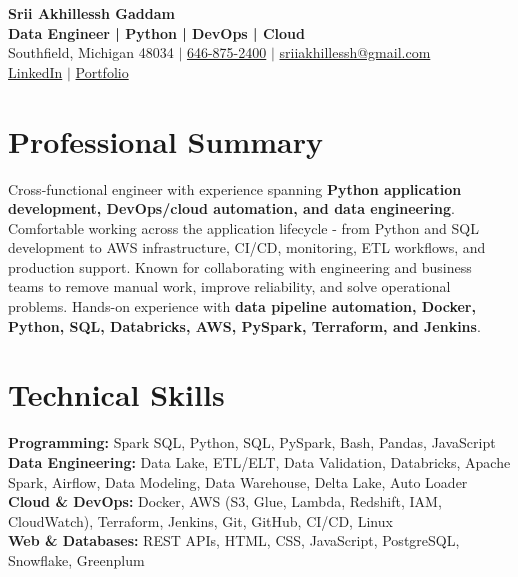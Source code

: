 \documentclass[letterpaper,10pt]{article}
\begin{document}
\fontsize{9.35pt}{10.45pt}\selectfont

\begin{center}
    {\LARGE \textbf{Srii Akhillessh Gaddam}} \\[-1pt]
    \textbf{Data Engineer | Python | DevOps | Cloud} \\[2pt]
    Southfield, Michigan 48034 $|$
    \href{tel:6468752400}{646-875-2400} $|$
    \href{mailto:sriiakhillessh@gmail.com}{sriiakhillessh@gmail.com} \\[1pt]
    \href{https://www.linkedin.com/in/srii-akhiilessh-gaddam-b48668191/}{LinkedIn} $|$
    \href{https://sriiakhillesshg.github.io/portfolio/}{Portfolio}
\end{center}
\vspace{-8pt}

\section{Professional Summary}
\small{Cross-functional engineer with experience spanning \textbf{Python application development, DevOps/cloud automation, and data engineering}. Comfortable working across the application lifecycle - from Python and SQL development to AWS infrastructure, CI/CD, monitoring, ETL workflows, and production support. Known for collaborating with engineering and business teams to remove manual work, improve reliability, and solve operational problems. Hands-on experience with \textbf{data pipeline automation, Docker, Python, SQL, Databricks, AWS, PySpark, Terraform, and Jenkins}.}

\section{Technical Skills}
\small{
\textbf{Programming:} Spark SQL, Python, SQL, PySpark, Bash, Pandas, JavaScript \\
\textbf{Data Engineering:} Data Lake, ETL/ELT, Data Validation, Databricks, Apache Spark, Airflow, Data Modeling, Data Warehouse, Delta Lake, Auto Loader \\
\textbf{Cloud \& DevOps:} Docker, AWS (S3, Glue, Lambda, Redshift, IAM, CloudWatch), Terraform, Jenkins, Git, GitHub, CI/CD, Linux \\
\textbf{Web \& Databases:} REST APIs, HTML, CSS, JavaScript, PostgreSQL, Snowflake, Greenplum
}
\end{document}
